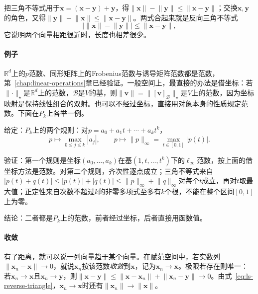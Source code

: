 把三角不等式用于$\bm x=(\bm x-\bm y)+\bm y$，得$\lVert\bm x\rVert-\lVert\bm y\rVert\leq\lVert\bm x-\bm y\rVert$；交换$\bm x,\bm y$的角色，又得$\lVert\bm y\rVert-\lVert\bm x\rVert\leq\lVert\bm x-\bm y\rVert$。两式合起来就是反向三角不等式
\begin{equation}
 \bigl|\lVert\bm x\rVert-\lVert\bm y\rVert\bigr|\leq\lVert\bm x-\bm y\rVert,
 \label{eq:ls-reverse-triangle}
\end{equation}
它说明两个向量相距很近时，长度也相差很少。

\paragraph{例子}
$\mathbb R^d$上的$p$范数、同形矩阵上的Frobenius范数与诱导矩阵范数都是范数，第~\ref{chap:linear-operations}章已经验证。一般空间上，最直接的办法是借坐标：若$\lVert\cdot\rVert_\star$是$\mathbb R^d$上的范数，$\mathcal B$是$V$的基，则$\lVert\bm v\rVert=\lVert[\bm v]_{\mathcal B}\rVert_\star$是$V$上的范数，因为坐标映射是保持线性组合的双射。也可以不经过坐标，直接用对象本身的性质规定范数。下面在$P_k$上各举一例。
\begin{example}[多项式空间上的两个范数]
\label{ex:ls-polynomial-norms}
给定：$P_k$上的两个规则：对$p=a_0+a_1t+\cdots+a_kt^k$，
\[
 p\mapsto\max_{0\leq j\leq k}|a_j|,
 \qquad
 p\mapsto\lVert p\rVert_\infty=\max_{t\in[0,1]}|p(t)| .
\]

验证：第一个规则是坐标$(a_0,\ldots,a_k)$在基$(1,t,\ldots,t^k)$下的$\ell_\infty$范数，按上面的借坐标方法是范数。对第二个规则，齐次性逐点成立；三角不等式来自$|p(t)+q(t)|\leq|p(t)|+|q(t)|\leq\lVert p\rVert_\infty+\lVert q\rVert_\infty$对每个$t$成立，再对$t$取最大值；正定性来自次数不超过$k$的非零多项式至多有$k$个根，不能在整个区间$[0,1]$上为零。

结论：二者都是$P_k$上的范数，前者经过坐标，后者直接用函数值。
\end{example}

\paragraph{收敛}
有了距离，就可以说一列向量趋于某个向量。在赋范空间中，若实数列$\lVert\bm x_n-\bm x\rVert\to0$，就说$\bm x_n$按该范数\emph{收敛}到$\bm x$，记为$\bm x_n\to\bm x$。极限若存在则唯一：若$\bm x_n\to\bm x$且$\bm x_n\to\bm y$，则$\lVert\bm x-\bm y\rVert\leq\lVert\bm x-\bm x_n\rVert+\lVert\bm x_n-\bm y\rVert\to0$。由式~\eqref{eq:ls-reverse-triangle}，$\bm x_n\to\bm x$时还有$\lVert\bm x_n\rVert\to\lVert\bm x\rVert$。

